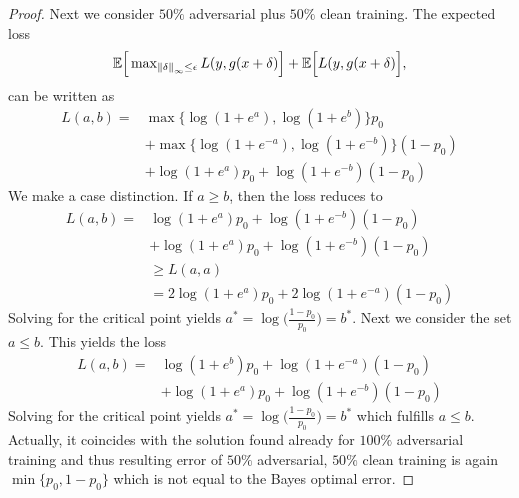 \begin{proof}
    Next we consider $50\%$ adversarial plus $50\%$ clean training. The expected loss 
	\begin{align*}
		\mathbb{E}\Big[\mathop{\rm max}\nolimits_{\left\|\delta\right\|_\infty\leq \epsilon} L(y,g(x+\delta)\Big] + \mathbb{E}\Big[ L(y,g(x+\delta)\Big],
	\end{align*}
	can be written as
    \begin{align*}
	    L(a,b)=&  \max\Big\{ \log(1+e^a),\log(1+e^b)\Big\}p_0 \\
	           &+ \max\Big\{ \log(1+e^{-a}),\log(1+e^{-b})\Big\}(1-p_0)\\
	           &+ \log(1+e^a)p_0 + \log(1+e^{-b})(1-p_0)
    \end{align*}
    We make a case distinction. If $a\geq b$, then the loss reduces to
    \begin{align*}
	    L(a,b)=&    \log(1+e^a)p_0 + \log(1+e^{-b})(1-p_0) \\
	           & + \log(1+e^a)p_0 + \log(1+e^{-b})(1-p_0)\\
	           &\geq L(a,a)\\
	           &=2\log(1+e^a)p_0 + 2\log(1+e^{-a})(1-p_0)
    \end{align*}
    Solving for the critical point yields $a^*=\log\Big(\frac{1-p_0}{p_0}\Big)=b^*$. Next we consider the set $a\leq b$.  This yields the loss
    \begin{align*}
	    L(a,b)=& \log(1+e^b)p_0 + \log(1+e^{-a})(1-p_0)\\
	           &+ \log(1+e^a)p_0 + \log(1+e^{-b})(1-p_0)
    \end{align*}
    Solving for the critical point yields $a^*=\log\Big(\frac{1-p_0}{p_0}\Big)=b^*$ which fulfills $a\leq b$. Actually, it coincides with the solution found already for $100\%$ adversarial training and thus resulting error of $50\%$ adversarial, $50\%$ clean training is again $\min\{p_0,1-p_0\}$ which is not equal to the Bayes optimal error.
    

\end{proof}
